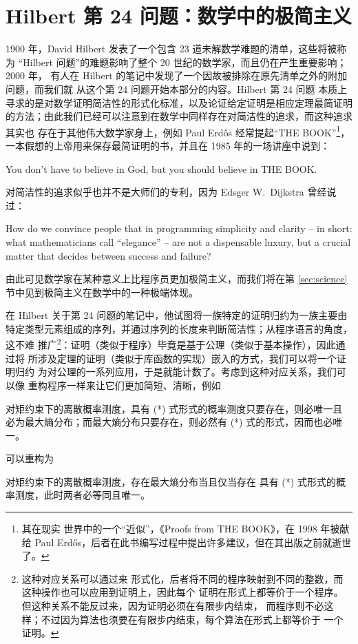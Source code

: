 \newpart
\section{Hilbert 第 24 问题：数学中的极简主义}\label{sec:hilbert}

1900 年，David Hilbert 发表了一个包含 23 道未解数学难题的清单，这些将被称为
“Hilbert 问题”的难题影响了整个 20 世纪的数学家，而且仍在产生重要影响；2000 年，
有人在 Hilbert 的笔记中发现了一个因故被排除在原先清单之外的附加问题，而我们就
从这个第 24 问题开始本部分的内容。Hilbert 第 24 问题
本质上寻求的是对数学证明简洁性的形式化标准，以及论证给定证明是相应定理最简证明
的方法；由此我们已经可以注意到在数学中同样存在对简洁性的追求，而这种追求其实也
存在于其他伟大数学家身上，例如 Paul Erdős 经常提起“THE BOOK”\footnote{其在现实
世界中的一个“近似”，《Proofs from THE BOOK》，在 1998
年被献给 Paul Erdős，后者在此书编写过程中提出许多建议，但在其出版之前就逝世
了。}，一本假想的上帝用来保存最简证明的书，并且在 1985 年的一场讲座中说到：
\begin{quoting}
	You don't have to believe in God, but you should believe in THE BOOK.
\end{quoting}
对简洁性的追求似乎也并不是大师们的专利，因为 Edsger W.\ Dijkstra 曾经说过：
\begin{quoting}
	How do we convince people that in programming simplicity and clarity --
	in short: what mathematicians call ``elegance'' -- are not a dispensable
	luxury, but a crucial matter that decides between success and failure?
\end{quoting}
由此可见数学家在某种意义上比程序员更加极简主义，而我们将在第
\ref{sec:science} 节中见到极简主义在数学中的一种极端体现。

在 Hilbert 关于第 24 问题的笔记中，他试图将一族特定的证明归约为一族主要由
特定类型元素组成的序列，并通过序列的长度来判断简洁性；从程序语言的角度，这不难
推广\footnote{这种对应关系可以通过来
形式化，后者将不同的程序映射到不同的整数，而这种操作也可以应用到证明上，因此每个
证明在形式上都等价于一个程序。但这种关系不能反过来，因为证明必须在有限步内结束，
而程序则不必这样；不过因为算法也须要在有限步内结束，每个算法在形式上都等价于
一个证明。}：证明（类似于程序）毕竟是基于公理（类似于基本操作），因此通过将
所涉及定理的证明（类似于库函数的实现）嵌入的方式，我们可以将一个证明归约
为对公理的一系列应用，于是就能计数了。考虑到这种对应关系，我们可以像
重构程序一样来让它们更加简短、清晰，例如
\begin{quoting}
	对矩约束下的离散概率测度，具有 (*) 式形式的概率测度只要存在，则必唯一且
	必为最大熵分布；而最大熵分布只要存在，则必然有 (*) 式的形式，因而也必唯一。
\end{quoting}
可以重构为
\begin{quoting}
	对矩约束下的离散概率测度，存在最大熵分布当且仅当存在
	具有 (*) 式形式的概率测度，此时两者必等同且唯一。
\end{quoting}

